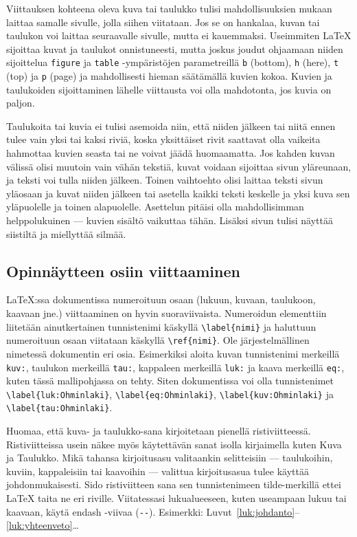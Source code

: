 \documentclass[finnish, 12pt, a4paper, elec, utf8, a-2b, online]{aaltothesis}
\begin{document}
Viittauksen kohteena oleva kuva tai taulukko tulisi mahdollisuuksien mukaan 
laittaa samalle sivulle, jolla siihen viitataan. Jos se on hankalaa, kuvan tai 
taulukon voi laittaa seuraavalle sivulle, mutta ei kauemmaksi. Useimmiten 
\LaTeX{} sijoittaa kuvat ja taulukot onnistuneesti, mutta joskus joudut 
ohjaamaan niiden sijoittelua \texttt{figure} ja \texttt{table} -ympäristöjen 
parametreillä \texttt{b} (bottom), \texttt{h} (here), \texttt{t} (top) ja 
\texttt{p} (page) ja mahdollisesti hieman säätämällä kuvien kokoa. Kuvien ja 
taulukoiden sijoittaminen lähelle viittausta voi olla mahdotonta, jos kuvia on 
paljon.

Taulukoita tai kuvia ei tulisi asemoida niin, että niiden jälkeen tai niitä 
ennen tulee vain yksi tai kaksi riviä, koska yksittäiset rivit saattavat olla 
vaikeita hahmottaa kuvien seasta tai ne voivat jäädä huomaamatta. Jos kahden 
kuvan välissä olisi muutoin vain vähän tekstiä, kuvat voidaan sijoittaa sivun 
yläreunaan, ja teksti voi tulla niiden jälkeen. Toinen vaihtoehto olisi laittaa 
teksti sivun yläosaan ja kuvat niiden jälkeen tai asetella kaikki teksti 
keskelle ja yksi kuva sen yläpuolelle ja toinen alapuolelle. Asettelun pitäisi 
olla mahdollisimman helppolukuinen --- kuvien sisältö vaikuttaa tähän. Lisäksi 
sivun tulisi näyttää siistiltä ja miellyttää silmää.

\subsection{Opinnäytteen osiin viittaaminen}

\LaTeX{}:ssa dokumentissa numeroituun osaan (lukuun, kuvaan, taulukoon, 
kaavaan jne.) viittaaminen on hyvin suoraviivaista. Numeroidun elementtiin 
liitetään ainutkertainen tunnistenimi käskyllä \verb+\label{nimi}+ ja haluttuun 
numeroituun osaan viitataan käskyllä \verb+\ref{nimi}+. Ole järjestelmällinen 
nimetessä dokumentin eri osia. Esimerkiksi aloita kuvan tunnistenimi merkeillä 
\texttt{kuv:}, taulukon merkeillä \texttt{tau:}, kappaleen merkeillä 
\texttt{luk:} ja kaava merkeillä \texttt{eq:}, kuten tässä mallipohjassa on 
tehty. Siten dokumentissa voi olla tunnistenimet \verb+\label{luk:Ohminlaki}+, 
\verb+\label{eq:Ohminlaki}+, \verb+\label{kuv:Ohminlaki}+ ja 
\verb+\label{tau:Ohminlaki}+.

Huomaa, että kuva- ja taulukko-sana kirjoitetaan pienellä ristiviitteessä. 
Ristiviitteissa usein näkee myös käytettävän sanat isolla kirjaimella kuten 
Kuva ja Taulukko. Mikä tahansa kirjoitusasu valitaankin selitteisiin --- 
taulukoihin, kuviin, kappaleisiin tai kaavoihin --- valittua kirjoitusasua 
tulee käyttää johdonmukaisesti. Sido ristiviitteen sana sen tunnistenimeen 
tilde-merkillä ettei \LaTeX{} taita ne eri riville. Viitatessasi lukualueeseen, 
kuten useampaan lukuu tai kaavaan, käytä endash -viivaa (\verb+--+). Esimerkki: 
Luvut~\ref{luk:johdanto}--\ref{luk:yhteenveto}\ldots
\end{document}
